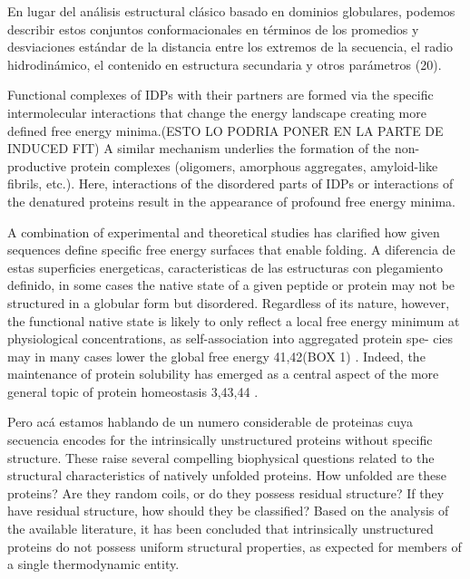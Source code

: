 En lugar del análisis estructural clásico basado en dominios globulares, podemos describir estos conjuntos conformacionales en términos de los promedios y desviaciones estándar de la distancia entre los extremos de la secuencia, el radio hidrodinámico, el contenido en estructura secundaria y otros parámetros (20).

Functional complexes of IDPs with their partners are formed via the specific intermolecular interactions that change the energy landscape creating more defined free energy minima.(ESTO LO PODRIA PONER EN LA PARTE DE INDUCED FIT)
A similar mechanism underlies the formation of the non-productive protein complexes (oligomers, amorphous aggregates, amyloid-like fibrils, etc.). Here, interactions of the disordered parts of IDPs or interactions of the denatured proteins result in the appearance of profound free energy minima.





A combination of experimental and theoretical studies has clarified how given sequences define specific free energy surfaces that enable folding.
A diferencia de estas superficies energeticas, caracteristicas de las estructuras con plegamiento definido, in some cases the native state of a given peptide or protein may not be structured in a globular form but disordered.
Regardless of its nature, however, the functional native state is likely to only reflect a local free energy minimum at physiological concentrations, as self-association into aggregated protein spe-
cies may in many cases lower the global free energy 41,42(BOX 1) . Indeed, the maintenance of protein solubility has emerged as a central aspect of the more general topic of protein homeostasis 3,43,44 .

Pero acá estamos hablando de un numero considerable de proteinas cuya secuencia encodes for the intrinsically unstructured proteins without specific structure.
These raise several compelling biophysical questions related to the structural characteristics of natively unfolded proteins. How unfolded are these proteins? Are they random coils, or do
they possess residual structure? If they have residual structure, how should they be classified?
Based on the analysis of the available literature, it has been concluded that intrinsically unstructured proteins do not possess uniform structural properties, as expected for members of a single thermodynamic entity.


